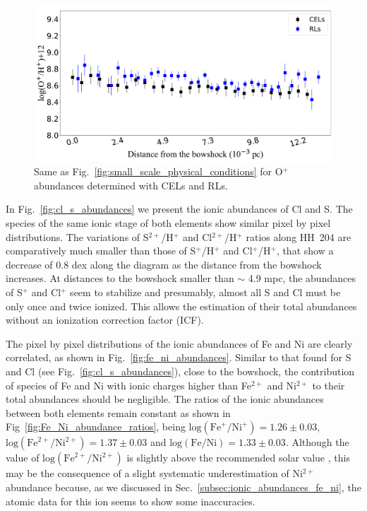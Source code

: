 \documentclass[twocolumn]{aastex63}
\begin{document}
\begin{figure}
\centering
\includegraphics[width=\columnwidth]{O2_cels_rls_distribution.pdf}
\caption{Same as Fig.~\ref{fig:small_scale_physical_conditions} for O$^{+}$ abundances determined with CELs and RLs.}
\label{fig:O2_abundances_cels_rls}
\end{figure}

In Fig.~\ref{fig:cl_s_abundances} we present the ionic abundances of Cl and S. The species of the same ionic stage of both elements show similar pixel by pixel distributions. The variations of S$^{2+}$/H$^+$ and Cl$^{2+}$/H$^+$ ratios along HH~204 are comparatively much smaller than those of S$^{+}$/H$^+$ and Cl$^{+}$/H$^+$, that show a decrease of 0.8 dex along the diagram as the distance from the bowshock increases. %
At distances to the bowshock smaller than $\sim$ 4.9 mpc, the abundances of S$^{+}$ and Cl$^{+}$ seem to stabilize and presumably, almost all S and Cl must be only once and twice ionized. This allows the estimation of their total abundances without an ionization correction factor (ICF).

The pixel by pixel distributions of the ionic abundances of Fe and Ni are clearly correlated, as shown in Fig.~\ref{fig:fe_ni_abundances}. Similar to that found for S and Cl (see Fig.~\ref{fig:cl_s_abundances}), close to the bowshock, the contribution of species of Fe and Ni with ionic charges higher than Fe$^{2+}$ and Ni$^{2+}$ to their total abundances should be negligible. The ratios of the ionic abundances between both elements remain constant as shown in Fig~\ref{fig:Fe_Ni_abundance_ratios}, being $\text{log}(\text{Fe}^{+}/\text{Ni}^{+})=1.26\pm 0.03$, $\text{log}(\text{Fe}^{2+}/\text{Ni}^{2+})=1.37\pm 0.03$ and $\text{log}(\text{Fe}/\text{Ni})=1.33\pm 0.03$. Although the value of $\text{log}(\text{Fe}^{2+}/\text{Ni}^{2+})$ is slightly above the recommended solar value \citep[$\text{log}(\text{Fe}/\text{Ni})_{\odot}=1.25\pm 0.05$,][]{lodders19}, this may be the consequence of a slight systematic underestimation of Ni$^{2+}$ abundance because, as we discussed in Sec.~\ref{subsec:ionic_abundances_fe_ni}, the atomic data for this ion seems to show some inaccuracies. 
\end{document}
